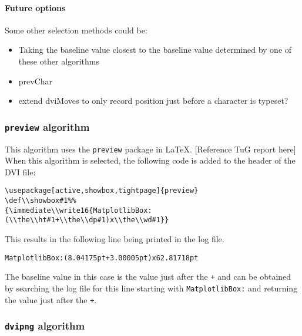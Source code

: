 \documentclass[]{article}
\let\oldparagraph\paragraph
\renewcommand{\paragraph}[1]{\oldparagraph{#1}\mbox{}}
\begin{document}
\paragraph{Future options}\label{future-options}

Some other selection methods could be:

\begin{itemize}
\item
  Taking the baseline value closest to the baseline value determined by
  one of these other algorithms
\item
  prevChar
\item
  extend dviMoves to only record position just before a character is
  typeset?
\end{itemize}

\subsubsection{\texorpdfstring{\texttt{preview}
algorithm}{preview algorithm}}\label{preview-algorithm}

This algorithm uses the \texttt{preview} package in \LaTeX{}.
{[}Reference TuG report here{]} When this algorithm is selected, the
following code is added to the header of the DVI file:

\begin{verbatim}
\usepackage[active,showbox,tightpage]{preview}
\def\\showbox#1%%
{\immediate\\write16{MatplotlibBox:(\\the\\ht#1+\\the\\dp#1)x\\the\\wd#1}}
\end{verbatim}

This results in the following line being printed in the log file.

\begin{verbatim}
MatplotlibBox:(8.04175pt+3.00005pt)x62.81718pt
\end{verbatim}

The baseline value in this case is the value just after the \texttt{+}
and can be obtained by searching the log file for this line starting
with \texttt{MatplotlibBox:} and returning the value just after the
\texttt{+}.

\subsubsection{\texorpdfstring{\texttt{dvipng}
algorithm}{dvipng algorithm}}\label{dvipng-algorithm}
\end{document}
